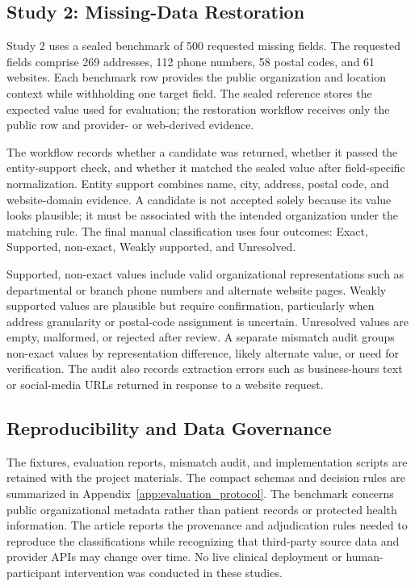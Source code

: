 \documentclass[journal,article,submit,moreauthors]{Definitions/mdpi}
\begin{document}
\subsection{Study 2: Missing-Data Restoration}

Study 2 uses a sealed benchmark of 500 requested missing fields. The requested fields comprise 269 addresses, 112 phone numbers, 58 postal codes, and 61 websites. Each benchmark row provides the public organization and location context while withholding one target field. The sealed reference stores the expected value used for evaluation; the restoration workflow receives only the public row and provider- or web-derived evidence.

The workflow records whether a candidate was returned, whether it passed the entity-support check, and whether it matched the sealed value after field-specific normalization. Entity support combines name, city, address, postal code, and website-domain evidence. A candidate is not accepted solely because its value looks plausible; it must be associated with the intended organization under the matching rule. The final manual classification uses four outcomes: Exact, Supported, non-exact, Weakly supported, and Unresolved.

Supported, non-exact values include valid organizational representations such as departmental or branch phone numbers and alternate website pages. Weakly supported values are plausible but require confirmation, particularly when address granularity or postal-code assignment is uncertain. Unresolved values are empty, malformed, or rejected after review. A separate mismatch audit groups non-exact values by representation difference, likely alternate value, or need for verification. The audit also records extraction errors such as business-hours text or social-media URLs returned in response to a website request.

\subsection{Reproducibility and Data Governance}

The fixtures, evaluation reports, mismatch audit, and implementation scripts are retained with the project materials. The compact schemas and decision rules are summarized in Appendix~\ref{app:evaluation_protocol}. The benchmark concerns public organizational metadata rather than patient records or protected health information. The article reports the provenance and adjudication rules needed to reproduce the classifications while recognizing that third-party source data and provider APIs may change over time. No live clinical deployment or human-participant intervention was conducted in these studies.
\end{document}

